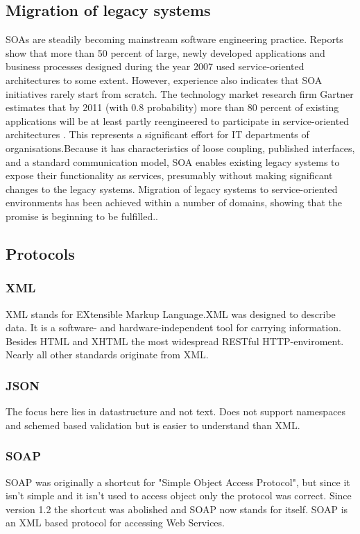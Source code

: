 \documentclass[12pt]{article}
\begin{document}
\subsection{Migration of legacy systems}
SOAs are steadily becoming mainstream software engineering practice. Reports show that more than 50 percent of large, newly developed applications and business processes designed during the year 2007 used service-oriented architectures to some extent. However, experience also indicates that SOA initiatives rarely start from scratch. The technology market research firm Gartner estimates that by 2011 (with 0.8 probability) more than 80 percent of existing applications will be at least partly reengineered to participate in service-oriented architectures . This represents a significant effort for IT departments of organisations.Because it has characteristics of loose coupling, published interfaces, and a standard communication model, SOA enables existing legacy systems to expose their functionality as services, presumably without making significant changes to the legacy systems. Migration of legacy systems to service-oriented environments has been achieved within a number of domains, showing that the promise is beginning to be fulfilled.\cite{legacy}.
\\
\subsection{Protocols}

\subsubsection{XML}
XML stands for EXtensible Markup Language.XML was designed to describe data.
It is a software- and hardware-independent tool for carrying information.\\
Besides HTML and XHTML the most widespread RESTful HTTP-enviroment.\\
Nearly all other standards originate from XML.
\subsubsection{JSON}
The focus here lies in datastructure and not text.
Does not support namespaces and schemed based validation but is easier to understand
than XML.
\subsubsection{SOAP}
SOAP was originally a shortcut for "Simple Object Access Protocol", but since it isn't simple 
and it isn't used to access object only the protocol was correct. Since version 1.2 the shortcut
was abolished and SOAP now stands for itself. SOAP is an XML based protocol for accessing Web Services.
\end{document}
